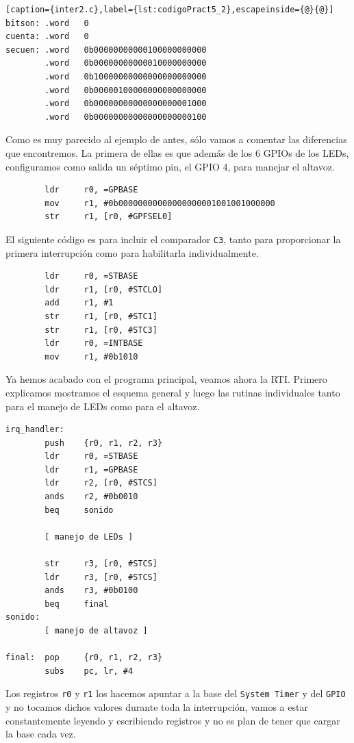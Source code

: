 \begin{lstlisting}[caption={inter2.c},label={lst:codigoPract5_2},escapeinside={@}{@}]
bitson: .word   0
cuenta: .word   0
secuen: .word   0b00000000000100000000000
        .word   0b00000000000010000000000
        .word   0b10000000000000000000000
        .word   0b00000100000000000000000
        .word   0b00000000000000000001000
        .word   0b00000000000000000000100
\end{lstlisting}

Como es muy parecido al ejemplo de antes, sólo vamos a comentar las diferencias que encontremos.
La primera de ellas es que además de los 6 GPIOs de los LEDs, configuramos como salida un séptimo
pin, el GPIO 4, para manejar el altavoz.

\begin{lstlisting}
        ldr     r0, =GPBASE
        mov     r1, #0b00000000000000000001001001000000
        str     r1, [r0, #GPFSEL0]
\end{lstlisting}

El siguiente código es para incluir el comparador {\tt C3}, tanto para proporcionar la primera
interrupción como para habilitarla individualmente.

\begin{lstlisting}
        ldr     r0, =STBASE
        ldr     r1, [r0, #STCLO]
        add     r1, #1
        str     r1, [r0, #STC1]
        str     r1, [r0, #STC3]
        ldr     r0, =INTBASE
        mov     r1, #0b1010
\end{lstlisting}

Ya hemos acabado con el programa principal, veamos ahora la RTI. Primero explicamos mostramos
el esquema general y luego las rutinas individuales tanto para el manejo de LEDs como para el
altavoz.

\begin{lstlisting}
irq_handler:
        push    {r0, r1, r2, r3}
        ldr     r0, =STBASE
        ldr     r1, =GPBASE
        ldr     r2, [r0, #STCS]
        ands    r2, #0b0010
        beq     sonido

        [ manejo de LEDs ]

        str     r3, [r0, #STCS]
        ldr     r3, [r0, #STCS]
        ands    r3, #0b0100
        beq     final
sonido:
        [ manejo de altavoz ]

final:  pop     {r0, r1, r2, r3}
        subs    pc, lr, #4
\end{lstlisting}

Los registros {\tt r0} y {\tt r1} los hacemos apuntar a la base del {\tt System Timer} y del
{\tt GPIO} y no tocamos dichos valores durante toda la interrupción, vamos a estar
constantemente leyendo y escribiendo registros y no es plan de tener que cargar la
base cada vez.

